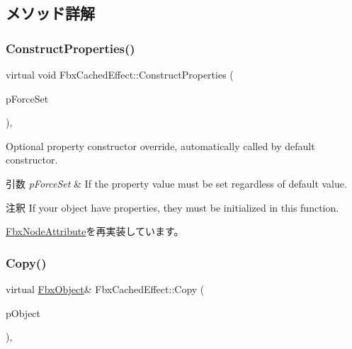 \subsection{メソッド詳解}
\mbox{\label{class_fbx_cached_effect_a0a33b753735747046809b241eadb19d2}} 
\subsubsection{\texorpdfstring{Construct\+Properties()}{ConstructProperties()}}
{\footnotesize\ttfamily virtual void Fbx\+Cached\+Effect\+::\+Construct\+Properties (\begin{DoxyParamCaption}\item[{bool}]{p\+Force\+Set }\end{DoxyParamCaption})\hspace{0.3cm}{\ttfamily [protected]}, {\ttfamily [virtual]}}

Optional property constructor override, automatically called by default constructor. 
\begin{DoxyParams}{引数}
{\em p\+Force\+Set} & If the property value must be set regardless of default value. \\
\hline
\end{DoxyParams}
\begin{DoxyRemark}{注釈}
If your object have properties, they must be initialized in this function. 
\end{DoxyRemark}


\hyperlink{class_fbx_node_attribute_a042eb9949a9b9634dcc5f126e82fd04a}{Fbx\+Node\+Attribute}を再実装しています。

\mbox{\label{class_fbx_cached_effect_a6e336fc1b97a28cbc5cecfc248efe451}} 
\subsubsection{\texorpdfstring{Copy()}{Copy()}}
{\footnotesize\ttfamily virtual \hyperlink{class_fbx_object}{Fbx\+Object}\& Fbx\+Cached\+Effect\+::\+Copy (\begin{DoxyParamCaption}\item[{const \hyperlink{class_fbx_object}{Fbx\+Object} \&}]{p\+Object }\end{DoxyParamCaption})\hspace{0.3cm}{\ttfamily [protected]}, {\ttfamily [virtual]}}

